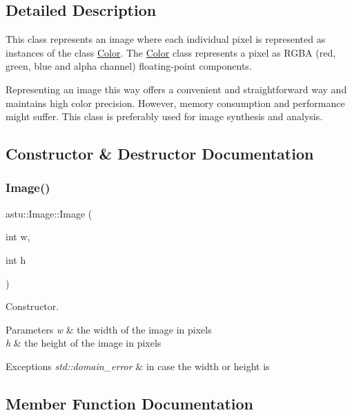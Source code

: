\subsection{Detailed Description}
This class represents an image where each individual pixel is represented as instances of the class \hyperlink{classastu_1_1Color}{Color}. The \hyperlink{classastu_1_1Color}{Color} class represents a pixel as R\+G\+BA (red, green, blue and alpha channel) floating-\/point components.

Representing an image this way offers a convenient and straightforward way and maintains high color precision. However, memory consumption and performance might suffer. This class is preferably used for image synthesis and analysis. 

\subsection{Constructor \& Destructor Documentation}
\mbox{\label{classastu_1_1Image_a930c3dfe86d60d209199cf27d2102446}} 
\subsubsection{\texorpdfstring{Image()}{Image()}}
{\footnotesize\ttfamily astu\+::\+Image\+::\+Image (\begin{DoxyParamCaption}\item[{int}]{w,  }\item[{int}]{h }\end{DoxyParamCaption})}

Constructor.


\begin{DoxyParams}{Parameters}
{\em w} & the width of the image in pixels \\
\hline
{\em h} & the height of the image in pixels \\
\hline
\end{DoxyParams}

\begin{DoxyExceptions}{Exceptions}
{\em std\+::domain\+\_\+error} & in case the width or height is \\
\hline
\end{DoxyExceptions}


\subsection{Member Function Documentation}
\mbox{\label{classastu_1_1Image_a06bdd931e5090f1eca62bd305b83cfd5}} 
